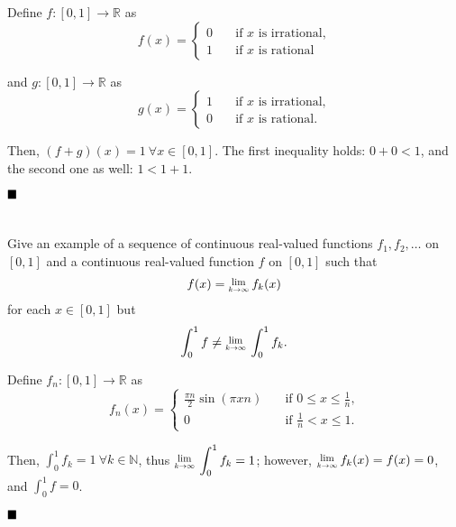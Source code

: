 \documentclass[11pt, a4paper, tikz]{article}
\newcommand{\centsection}[1]{
	\section*{\centering{#1}}
}
\renewcommand{\qed}{\hfill\blacksquare}
\newcommand{\Lim}[1]{\raisebox{0.5ex}{\scalebox{0.8}{$\displaystyle \lim_{#1}\;$}}}
\newcommand{\Int}[2]{\displaystyle \int_{#1}^{#2}}
\newcommand{\naturals}{
	\ensuremath{\mathbb{N}}
}
\newcommand{\reals}{
	\ensuremath{\mathbb{R}}
}
\begin{document}
	Define $f:[0,1]\rightarrow\reals$ as
	\[
		f(x) =
		\begin{cases}
			0 &\quad \textrm{if $x$ is irrational,}\\
			1 &\quad \textrm{if $x$ is rational}
		\end{cases}
	\]
	
	and $g:[0,1]\rightarrow\reals$ as
	\[
		g(x) =
		\begin{cases}
			1 &\quad \textrm{if $x$ is irrational,}\\
			0 &\quad \textrm{if $x$ is rational.}
		\end{cases}
	\]
	
	Then, $(f+g)(x) = 1\ \forall x\in[0,1]$. The first inequality holds: $0 + 0 < 1$, and the second one as well: $1 < 1 + 1$.
	
	$\qed$
	
	\centsection{Exercise 5}
	
	\begin{formulationBox}
		Give an example of a sequence of continuous real-valued functions $f_1, f_2, \dots$ on $[0,1]$ and a continuous real-valued function $f$ on $[0,1]$ such that \[f(x)=\Lim{k\rightarrow\infty}f_k(x)\] for each $x\in[0,1]$ but \[\Int{0}{1}f \neq \Lim{k\rightarrow\infty}\Int{0}{1}f_k.\]
	\end{formulationBox}
	
	Define $f_n:[0,1]\rightarrow\reals$ as
	\[
		f_n(x) =
		\begin{cases}
			\frac{\pi n}{2}\sin(\pi xn) &\quad \textrm{if $0\leq x\leq \frac{1}{n}$,}\\
			0 &\quad \textrm{if $\frac{1}{n} < x \leq 1$.}
		\end{cases}
	\]
	
	Then, $\Int{0}{1}f_k = 1\ \forall k\in\naturals$, thus $\Lim{k\rightarrow\infty}\Int{0}{1}f_k = 1$; however, $\Lim{k\rightarrow\infty}f_k(x) = f(x) = 0$, and $\Int{0}{1}f = 0$.
	
	$\qed$
\end{document}
